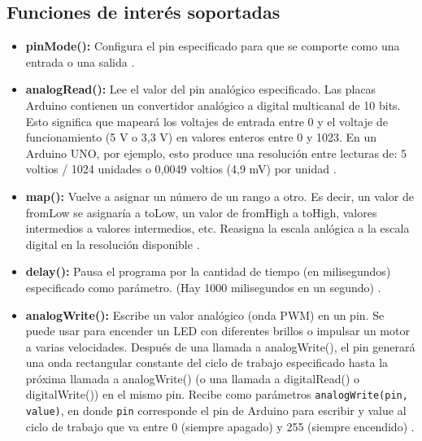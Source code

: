 \subsection{Funciones de interés soportadas}
\begin{itemize}
    \item \textbf{pinMode():} Configura el pin especificado para que se comporte como una entrada o una salida \cite{arduino}.
    \item \textbf{analogRead():} Lee el valor del pin analógico especificado. Las placas Arduino contienen un convertidor analógico a digital multicanal de 10 bits. Esto significa que mapeará los voltajes de entrada entre 0 y el voltaje de funcionamiento (5 V o 3,3 V) en valores enteros entre 0 y 1023. En un Arduino UNO, por ejemplo, esto produce una resolución entre lecturas de: 5 voltios / 1024 unidades o 0,0049 voltios (4,9 mV) por unidad \cite{arduino}.
    \item \textbf{map():} Vuelve a asignar un número de un rango a otro. Es decir, un valor de fromLow se asignaría a toLow, un valor de fromHigh a toHigh, valores intermedios a valores intermedios, etc. Reasigna la escala anlógica a la escala digital en la resolución disponible \cite{arduino}.
    \item \textbf{delay():}  Pausa el programa por la cantidad de tiempo (en milisegundos) especificado como parámetro. (Hay 1000 milisegundos en un segundo) \cite{arduino}.
    \item \textbf{analogWrite():} Escribe un valor analógico (onda PWM) en un pin. Se puede usar para encender un LED con diferentes brillos o impulsar un motor a varias velocidades. Después de una llamada a analogWrite(), el pin generará una onda rectangular constante del ciclo de trabajo especificado hasta la próxima llamada a analogWrite() (o una llamada a digitalRead() o digitalWrite()) en el mismo pin. Recibe como parámetros \texttt{analogWrite(pin, value)}, en donde \texttt{pin} corresponde el pin de Arduino para escribir y value al ciclo de trabajo que va entre 0 (siempre apagado) y 255 (siempre encendido) \cite{arduino}.
\end{itemize}
